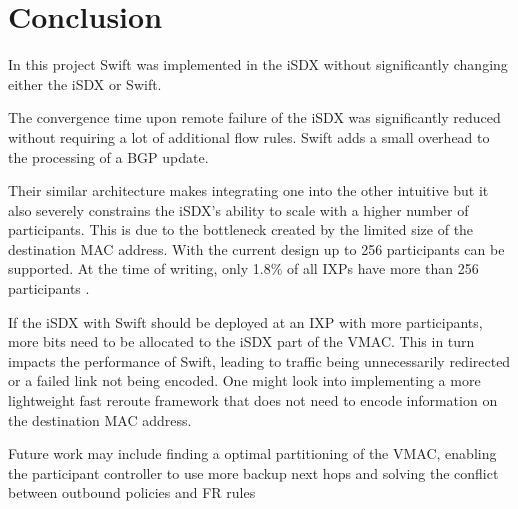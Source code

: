 \chapter{\label{chapter7}Conclusion}
In this project Swift was implemented in the iSDX without significantly changing either the iSDX or Swift.

The convergence time upon remote failure of the iSDX was significantly reduced without requiring a lot of additional flow rules. Swift adds a small overhead to the processing of a BGP update. 

Their similar architecture makes integrating one into the other intuitive but it also severely constrains the iSDX's ability to scale with a higher number of participants. This is due to the bottleneck created by the limited size of the destination MAC address. With the current design up to 256 participants can be supported. At the time of writing, only 1.8\% of all IXPs have more than 256 participants \cite{ixps}.

If the iSDX with Swift should be deployed at an IXP with more participants, more bits need to be allocated to the iSDX part of the VMAC. This in turn impacts the performance of Swift, leading to traffic being unnecessarily redirected or a failed link not being encoded. One might look into implementing a more lightweight fast reroute framework that does not need to encode information on the destination MAC address. 

Future work may include finding a optimal partitioning of the VMAC, enabling the participant controller to use more backup next hops and solving the conflict between outbound policies and FR rules